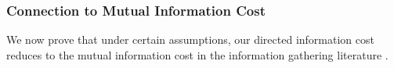 

\subsubsection{Connection to Mutual Information Cost}

We now prove that under certain assumptions, our directed information cost reduces to the mutual information cost in the information gathering literature \cite{sukhija2023optimistic, buisson2020actively,lew2022safe,krause2007nonmyopic,zimmer2018safe,abraham2019active,vantilborgh2025dual,davydov2024first, palafox2025info}.


